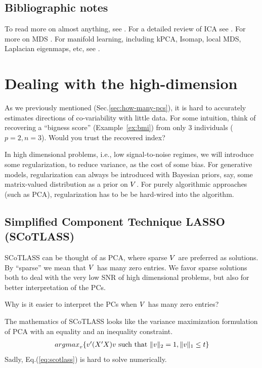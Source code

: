 \documentclass[12pt,a4paper]{article}
\begin{document}
\subsection{Bibliographic notes}
To read more on almost anything, see \citet{friedman2001elements}.
For a detailed review of ICA see \cite{hyvarinen2000independent}. 
For more on MDS \cite{borg2005modern}.
For manifold learning, including kPCA, Isomap, local MDS, Laplacian eigenmaps, etc, see \citet{mohri2012foundations}.








\section{Dealing with the high-dimension}

As we previously mentioned (Sec.\ref{sec:how-many-pcs}), it is hard to accurately estimates directions of co-variability with little data. 
For some intuition, think of recovering a ``bigness score'' (Example~\ref{ex:bmi}) from only 3 individuals ($p=2,n=3$). 
Would you trust the recovered index?

In high dimensional problems, i.e., low signal-to-noise regimes, we will introduce some regularization, to reduce variance, as the cost of some bias. 
For generative models, regularization can always be introduced with Bayesian priors, say, some matrix-valued distribution as a prior on $V$. 
For purely algorithmic approaches (such as PCA), regularization has to be be hard-wired into the algorithm.





\subsection{Simplified Component Technique LASSO (SCoTLASS)}

SCoTLASS can be thought of as PCA, where sparse $V$ are preferred as solutions.
By ``sparse'' we mean that $V$ has many zero entries. 
We favor sparse solutions both to deal with the very low SNR of high dimensional problems, but also for better interpretation of the PCs.

\begin{think}
	Why is it easier to interpret the PCs when $V$ has many zero entries?
\end{think}

The mathematics of SCoTLASS looks like the variance maximization formulation of PCA with an equality and an inequality constraint.
\begin{align}
\label{eq:scotlass}
	\textstyle{\mathop{argmax}_{v}}\{ v'(X'X)v  \text{ such that } \Vert v \Vert_2=1, \Vert v \Vert_1\leq t  \}
\end{align}
Sadly, Eq.(\ref{eq:scotlass}) is hard to solve numerically.
\end{document}
